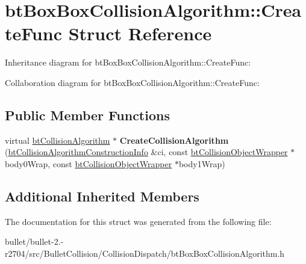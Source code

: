 \hypertarget{structbt_box_box_collision_algorithm_1_1_create_func}{\section{bt\+Box\+Box\+Collision\+Algorithm\+:\+:Create\+Func Struct Reference}
\label{structbt_box_box_collision_algorithm_1_1_create_func}
}


Inheritance diagram for bt\+Box\+Box\+Collision\+Algorithm\+:\+:Create\+Func\+:


Collaboration diagram for bt\+Box\+Box\+Collision\+Algorithm\+:\+:Create\+Func\+:
\subsection*{Public Member Functions}
\begin{DoxyCompactItemize}
\item 
\hypertarget{structbt_box_box_collision_algorithm_1_1_create_func_a4fdd39591ef0d49a251b648b39a0c4bf}{virtual \hyperlink{classbt_collision_algorithm}{bt\+Collision\+Algorithm} $\ast$ {\bfseries Create\+Collision\+Algorithm} (\hyperlink{structbt_collision_algorithm_construction_info}{bt\+Collision\+Algorithm\+Construction\+Info} \&ci, const \hyperlink{structbt_collision_object_wrapper}{bt\+Collision\+Object\+Wrapper} $\ast$body0\+Wrap, const \hyperlink{structbt_collision_object_wrapper}{bt\+Collision\+Object\+Wrapper} $\ast$body1\+Wrap)}\label{structbt_box_box_collision_algorithm_1_1_create_func_a4fdd39591ef0d49a251b648b39a0c4bf}

\end{DoxyCompactItemize}
\subsection*{Additional Inherited Members}


The documentation for this struct was generated from the following file\+:\begin{DoxyCompactItemize}
\item 
bullet/bullet-\/2.-\/r2704/src/\+Bullet\+Collision/\+Collision\+Dispatch/bt\+Box\+Box\+Collision\+Algorithm.\+h\end{DoxyCompactItemize}
